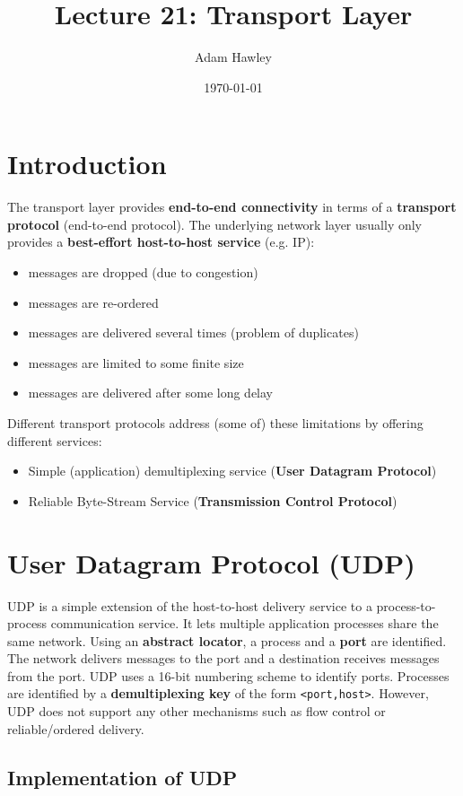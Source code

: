 \documentclass[11pt]{article}
\author{Adam Hawley}
\date{\today}
\title{Lecture 21: Transport Layer}
\begin{document}
\maketitle
\tableofcontents


\section{Introduction}
\label{sec:org41c3064}
The transport layer provides \textbf{end-to-end connectivity} in terms of a \textbf{transport protocol} (end-to-end protocol).
The underlying network layer usually only provides a \textbf{best-effort host-to-host service} (e.g. IP):
\begin{itemize}
\item messages are dropped (due to congestion)
\item messages are re-ordered
\item messages are delivered several times (problem of duplicates)
\item messages are limited to some finite size
\item messages are delivered after some long delay
\end{itemize}
Different transport protocols address (some of) these limitations by offering different services:
\begin{itemize}
\item Simple (application) demultiplexing service (\textbf{User Datagram Protocol})
\item Reliable Byte-Stream Service (\textbf{Transmission Control Protocol})
\end{itemize}

\section{User Datagram Protocol (UDP)}
\label{sec:org7f3376c}
UDP is a simple extension of the host-to-host delivery service to a process-to-process communication service.
It lets multiple application processes share the same network.
Using an \textbf{abstract locator}, a process and a \textbf{port} are identified.
The network delivers messages to the port and a destination receives messages from the port.
UDP uses a 16-bit numbering scheme to identify ports.
Processes are identified by a \textbf{demultiplexing key} of the form \texttt{<port,host>}.
However, UDP does not support any other mechanisms such as flow control or reliable/ordered delivery.

\subsection{Implementation of UDP}
\label{sec:orgc00e1bf}
\end{document}
